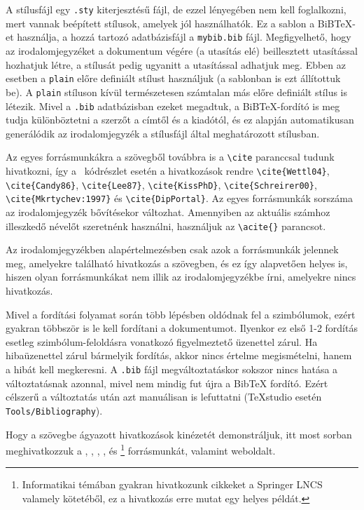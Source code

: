 A stílusfájl egy \verb+.sty+ kiterjesztésű fájl, de ezzel lényegében nem kell foglalkozni, mert vannak beépített stílusok, amelyek jól használhatók. Ez a sablon a BiB\TeX-et használja, a hozzá tartozó adatbázisfájl a \verb+mybib.bib+ fájl. Megfigyelhető, hogy az irodalomjegyzéket a dokumentum végére (a \verb++ utasítás elé) beillesztett \verb++ utasítással hozhatjuk létre, a stílusát pedig ugyanitt a  \verb++ utasítással adhatjuk meg. Ebben az esetben a \verb+plain+ előre definiált stílust használjuk (a sablonban is ezt állítottuk be). A \verb+plain+ stíluson kívül természetesen számtalan más előre definiált stílus is létezik. Mivel a \verb+.bib+ adatbázisban ezeket megadtuk, a BiB\TeX-fordító is meg tudja különböztetni a szerzőt a címtől és a kiadótól, és ez alapján automatikusan generálódik az irodalomjegyzék a stílusfájl által meghatározott stílusban.

Az egyes forrásmunkákra a szövegből továbbra is a \verb+\cite+ paranccsal tudunk hivatkozni, így a ~kódrészlet esetén a hivatkozások rendre \verb+\cite{Wettl04}+, \verb+\cite{Candy86}+, \verb+\cite{Lee87}+, \verb+\cite{KissPhD}+, \verb+\cite{Schreirer00}+,
\verb+\cite{Mkrtychev:1997}+ és \verb+\cite{DipPortal}+. Az egyes forrásmunkák sorszáma az irodalomjegyzék bővítésekor változhat. Amennyiben az aktuális számhoz illeszkedő névelőt szeretnénk használni, használjuk az \verb+\acite{}+ parancsot.

Az irodalomjegyzékben alapértelmezésben csak azok a forrásmunkák jelennek meg, amelyekre található hivatkozás a szövegben, és ez így alapvetően helyes is, hiszen olyan forrásmunkákat nem illik az irodalomjegyzékbe írni, amelyekre nincs hivatkozás.

Mivel a fordítási folyamat során több lépésben oldódnak fel a szimbólumok, ezért gyakran többször is le kell fordítani a dokumentumot. Ilyenkor ez első 1-2 fordítás esetleg szimbólum-feloldásra vonatkozó figyelmeztető üzenettel zárul. Ha hibaüzenettel zárul bármelyik fordítás, akkor nincs értelme megismételni, hanem a hibát kell megkeresni. A \verb+.bib+ fájl megváltoztatáskor sokszor nincs hatása a változtatásnak azonnal, mivel nem mindig fut újra a BibTeX fordító. Ezért célszerű a változtatás után azt manuálisan is lefuttatni (TeXstudio esetén \verb+Tools/Bibliography+).

Hogy a szövegbe ágyazott hivatkozások kinézetét demonstráljuk, itt most sorban meghivatkozzuk a \cite{Wettl04}, \cite{Candy86}, \cite{Lee87}, \cite{KissPhD}, \cite{Schreier00} és \footnote{Informatikai témában gyakran hivatkozunk cikkeket a Springer LNCS valamely kötetéből, ez a hivatkozás erre mutat egy helyes példát.} forrásmunkát, valamint  weboldalt.

